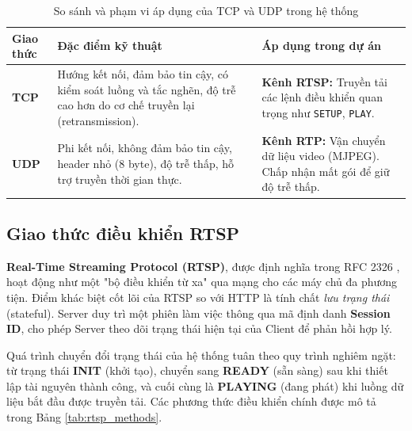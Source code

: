 \FloatBarrier
\begin{table}[H]
    \centering
    \caption{So sánh và phạm vi áp dụng của TCP và UDP trong hệ thống}
    \label{tab:tcp_udp}
    \begin{tabular}{p{}p{}p{}}
        \toprule
        \textbf{Giao thức} & \textbf{Đặc điểm kỹ thuật} & \textbf{Áp dụng trong dự án} \\
        \midrule
        \textbf{TCP} & Hướng kết nối, đảm bảo tin cậy, có kiểm soát luồng và tắc nghẽn, độ trễ cao hơn do cơ chế truyền lại (retransmission). & \textbf{Kênh RTSP:} Truyền tải các lệnh điều khiển quan trọng như \texttt{SETUP}, \texttt{PLAY}. \\
        \textbf{UDP} & Phi kết nối, không đảm bảo tin cậy, header nhỏ (8 byte), độ trễ thấp, hỗ trợ truyền thời gian thực. & \textbf{Kênh RTP:} Vận chuyển dữ liệu video (MJPEG). Chấp nhận mất gói để giữ độ trễ thấp. \\
        \bottomrule
    \end{tabular}
\end{table}
\FloatBarrier

\subsection{Giao thức điều khiển RTSP}

\textbf{Real-Time Streaming Protocol (RTSP)}, được định nghĩa trong RFC 2326 \cite{rfc2326}, hoạt động như một "bộ điều khiển từ xa" qua mạng cho các máy chủ đa phương tiện. Điểm khác biệt cốt lõi của RTSP so với HTTP là tính chất \textit{lưu trạng thái} (stateful). Server duy trì một phiên làm việc thông qua mã định danh \textbf{Session ID}, cho phép Server theo dõi trạng thái hiện tại của Client để phản hồi hợp lý. 

Quá trình chuyển đổi trạng thái của hệ thống tuân theo quy trình nghiêm ngặt: từ trạng thái \textbf{INIT} (khởi tạo), chuyển sang \textbf{READY} (sẵn sàng) sau khi thiết lập tài nguyên thành công, và cuối cùng là \textbf{PLAYING} (đang phát) khi luồng dữ liệu bắt đầu được truyền tải. Các phương thức điều khiển chính được mô tả trong Bảng \ref{tab:rtsp_methods}.

